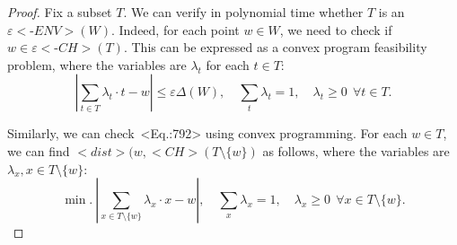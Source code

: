 \documentclass[11pt,letterpaper]{article}
\def\mathsf#1{<#1>}%
\def\eqref#1{<Eq.:#1>}%
\theoremstyle{definition}
\theoremstyle{remark}
\newcommand{\dst}{{\mathsf{dist}}}
\newcommand{\ch}{{\mathsf{CH}}}
\newcommand{\dia}{\Delta}
\newcommand{\eenv}{{\varepsilon{{\mathsf{\mbox{-}ENV}}}}}
\newcommand{\ech}{{\varepsilon{{\mathsf{\mbox{-}CH}}}}}
\begin{document}
\begin{proof}
Fix a subset $T$. We can verify in polynomial time whether $T$ is an $\eenv(W)$. Indeed, for each point $w \in W$, we need to check if $w \in \ech(T)$. This can be expressed as a convex program feasibility problem, where the variables are $\lambda_t$ for each $t \in T$: 
$$ \left|\sum_{t \in T} \lambda_t \cdot t - w \right| \leq \varepsilon \dia(W), \quad \sum_t \lambda_t = 1, \quad \lambda_t \geq 0 \  \  \forall t \in T.$$ 

Similarly, we can check~\eqref{792} using convex programming. For each $w \in T$, we can find $\dst(w, \ch(T \setminus  \{w\})$ as follows, where the variables are $\lambda_x, x \in T \setminus \{w\}$: 
$$ \min. \ \left| \sum_{x \in T \setminus \{w\}} \lambda_x \cdot x - w \right|, \quad \sum_x \lambda_x = 1, \quad \lambda_x \geq 0 \  \  \forall x \in T\setminus \{w\}. $$
\end{proof}
\end{document}
